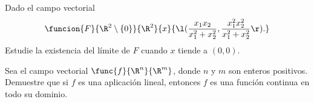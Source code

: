 \documentclass[a4,11pt]{aleph-examen}
\begin{document}
\begin{preguntas}
\begin{respuesta}
\begin{respuesta}
\item 
    Dado el campo vectorial
	\[
		\funcion{F}{\R^2\setminus\{0\}}{\R^2}{x}{\l(\dfrac{x_1x_2}{x_1^2+x_2^2},\dfrac{x_1^2x_2^2}{x_1^2+x_2^2}\r).}
	\]
	Estudie la existencia del límite de $F$ cuando $x$ tiende a $(0,0)$.


\item 
	Sea el campo vectorial $\func{f}{\R^n}{\R^m}$, donde $n$ y $m$ son enteros positivos. Demuestre que si $f$ es una aplicación lineal, entonces $f$ es una función continua en todo su dominio.


\end{respuesta}
\end{respuesta}
\end{preguntas}
\end{document}
